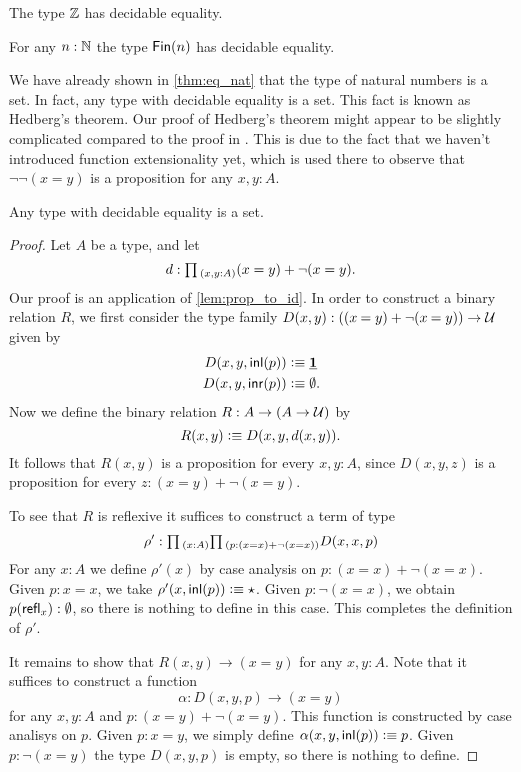 \begin{cor}
  The type ${\mathbb{Z}}$ has decidable equality.
\end{cor}

\begin{cor}
  For any $n:{\mathbb{N}}$ the type $\mathsf{Fin}(n)$ has decidable equality. 
\end{cor}

We have already shown in \cref{thm:eq_nat} that the type of natural numbers is a set. In fact, any type with decidable equality is a set. This fact is known as Hedberg's theorem. Our proof of Hedberg's theorem might appear to be slightly complicated compared to the proof in \cite{hottbook}. This is due to the fact that we haven't introduced function extensionality yet, which is used there to observe that $\neg\neg(x=y)$ is a proposition for any $x,y:A$.

\begin{thm}[Hedberg]
  Any type with decidable equality is a set.
\end{thm}

\begin{proof}
  Let $A$ be a type, and let
  \begin{equation*}
    d:\prd{x,y:A}(x=y)+\neg(x=y).
  \end{equation*}
  Our proof is an application of \cref{lem:prop_to_id}. In order to construct a binary relation $R$, we first consider the type family $D(x,y):((\id{x}{y})+\neg(\id{x}{y}))\to\UU$ given by
  \begin{align*}
    D(x,y,{\mathsf{inl}}(p)) & \vcentcolon\equiv \underline{\mathbf{1}} \\
    D(x,y,{\mathsf{inr}}(p)) & \vcentcolon\equiv \emptyset.
  \end{align*}
  Now we define the binary relation $R:A\to (A\to\mathcal{U})$ by
  \begin{equation*}
    R(x,y)\vcentcolon\equiv D(x,y,d(x,y)).
  \end{equation*}
  It follows that $R(x,y)$ is a proposition for every $x,y:A$, since $D(x,y,z)$ is a proposition for every $z:(x=y)+\neg(x=y)$.

  To see that $R$ is reflexive it suffices to construct a term of type
  \begin{equation*}
    \rho':\prd{x:A}{p:(x=x)+\neg(x=x)}D(x,x,p)
  \end{equation*}
  For any $x:A$ we define $\rho'(x)$ by case analysis on $p:(x=x)+\neg(x=x)$. Given $p:x=x$, we take $\rho'(x,{\mathsf{inl}}(p))\vcentcolon\equiv\star$. Given $p:\neg(x=x)$, we obtain $p(\mathsf{refl}_{x}):\emptyset$, so there is nothing to define in this case. This completes the definition of $\rho'$.
  
  It remains to show that $R(x,y)\to (x=y)$ for any $x,y:A$. Note that it suffices to construct a function
  \begin{equation*}
    \alpha:D(x,y,p)\to (x=y)
  \end{equation*}
  for any $x,y:A$ and $p:(x=y)+\neg(x=y)$. This function is constructed by case analisys on $p$. Given $p:x=y$, we simply define $\alpha(x,y,{\mathsf{inl}}(p))\vcentcolon\equiv p$. Given $p:\neg(x=y)$ the type $D(x,y,p)$ is empty, so there is nothing to define.
\end{proof}

